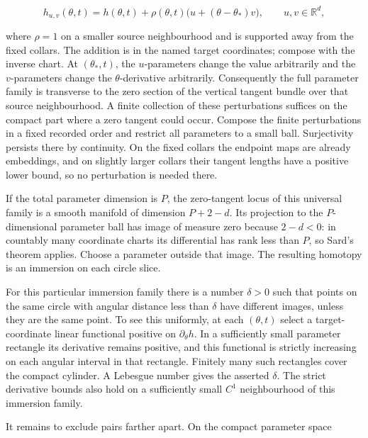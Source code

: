 \begin{equation}
h_{u,v}(\theta,t)
   =h(\theta,t)
      +\rho(\theta,t)\bigl(u+(\theta-\theta_*)v\bigr),
 \qquad u,v\in\mathbb R^d,
 \label{courseIII:framed-handle-slides-and-index-one-removal:eq:5.2}
\end{equation}

where \(\rho=1\) on a smaller source neighbourhood and is supported away from the fixed collars. The addition is in the named target coordinates; compose with the inverse chart. At \((\theta_*,t)\), the \(u\)-parameters change the value arbitrarily and the \(v\)-parameters change the \(\theta\)-derivative arbitrarily. Consequently the full parameter family is transverse to the zero section of the vertical tangent bundle over that source neighbourhood. A finite collection of these perturbations suffices on the compact part where a zero tangent could occur. Compose the finite perturbations in a fixed recorded order and restrict all parameters to a small ball. Surjectivity persists there by continuity. On the fixed collars the endpoint maps are already embeddings, and on slightly larger collars their tangent lengths have a positive lower bound, so no perturbation is needed there.

If the total parameter dimension is \(P\), the zero-tangent locus of this universal family is a smooth manifold of dimension \(P+2-d\). Its projection to the \(P\)-dimensional parameter ball has image of measure zero because \(2-d<0\): in countably many coordinate charts its differential has rank less than \(P\), so Sard's theorem applies. Choose a parameter outside that image. The resulting homotopy is an immersion on each circle slice.

For this particular immersion family there is a number \(\delta>0\) such that points on the same circle with angular distance less than \(\delta\) have different images, unless they are the same point. To see this uniformly, at each \((\theta,t)\) select a target-coordinate linear functional positive on \(\partial_\theta h\). In a sufficiently small parameter rectangle its derivative remains positive, and this functional is strictly increasing on each angular interval in that rectangle. Finitely many such rectangles cover the compact cylinder. A Lebesgue number gives the asserted \(\delta\). The strict derivative bounds also hold on a sufficiently small \(C^1\) neighbourhood of this immersion family.

It remains to exclude pairs farther apart. On the compact parameter space

